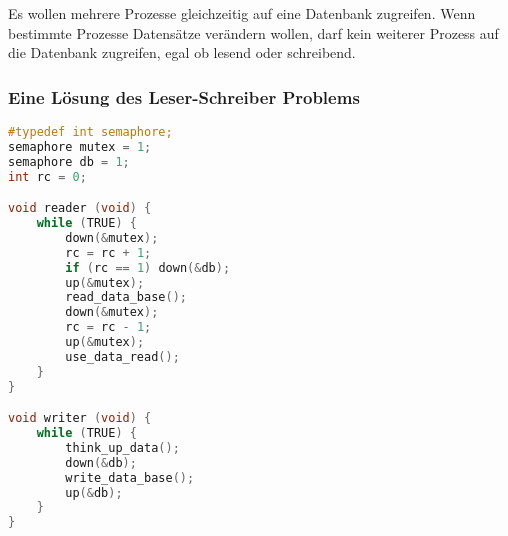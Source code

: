 Es wollen mehrere Prozesse gleichzeitig auf eine Datenbank zugreifen. Wenn
bestimmte Prozesse Datensätze verändern wollen, darf kein weiterer Prozess auf
die Datenbank zugreifen, egal ob lesend oder schreibend.

\subsubsection{Eine Lösung des Leser-Schreiber Problems}

\begin{lstlisting}[language=C]
#typedef int semaphore;
semaphore mutex = 1;
semaphore db = 1;
int rc = 0;

void reader (void) {
    while (TRUE) {
        down(&mutex);
        rc = rc + 1;
        if (rc == 1) down(&db);
        up(&mutex);
        read_data_base();
        down(&mutex);
        rc = rc - 1;
        up(&mutex);
        use_data_read();
    }
}

void writer (void) {
    while (TRUE) {
        think_up_data();
        down(&db);
        write_data_base();
        up(&db);
    }
}
\end{lstlisting}